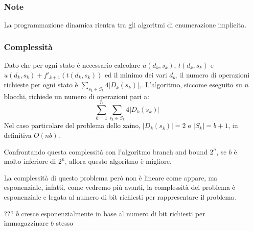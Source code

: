 \documentclass[../template]{subfiles}
\begin{document}
\subsubsection{Note}
La programmazione dinamica rientra tra gli algoritmi di enumerazione implicita.
\subsubsection{Complessità}
Dato che per ogni stato è necessario calcolare $u(d_k, s_k)$, $t(d_k, s_k)$ e $u(d_k, s_k) + f'_{k+1}(t(d_k, s_k))$ ed il minimo dei vari $d_k$, il numero di operazioni richieste per ogni stato è $\sum_{s_k \in S_k} 4 |D_k(s_k)|$,.
L'algoritmo, siccome eseguito su $n$ blocchi, richiede un numero di operazioni pari a:
\[
    \sum^n_{k=1} \sum_{s_k \in S_k} 4 |D_k(s_k)|
\]
Nel caso particolare del problema dello zaino, $|D_k(s_k)| = 2$ e $|S_k| = b + 1$, in definitiva
$O(nb)$.

Confrontando questa complessità con l'algoritmo branch and bound $2^n$, se $b$ è molto inferiore di $2^n$, allora questo algoritmo è migliore.

La complessità di questo problema però non è lineare come appare, ma esponenziale, infatti, come vedremo più avanti, la complessità del problema è esponenziale e legata al numero di bit richiesti per rappresentare il problema.

??? $b$ cresce esponenzialmente in base al numero di bit richiesti per immagazzinare $b$ stesso
\end{document}

